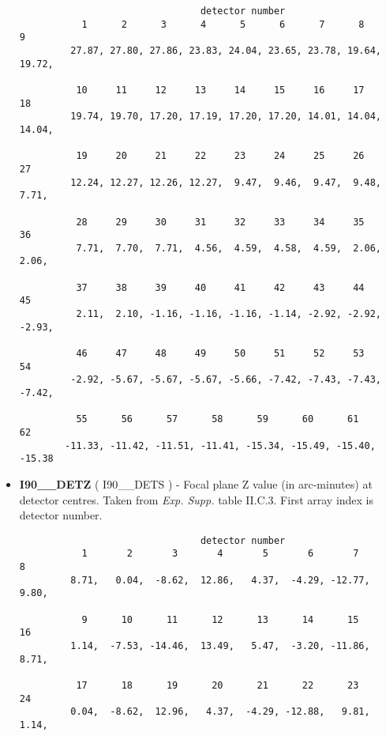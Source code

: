 \begin{itemize}
\begin{minipage}[t]{\textwidth}
\small
\begin{verbatim}
                                detector number
           1      2      3      4      5      6      7      8      9
         27.87, 27.80, 27.86, 23.83, 24.04, 23.65, 23.78, 19.64, 19.72, 

          10     11     12     13     14     15     16     17     18
         19.74, 19.70, 17.20, 17.19, 17.20, 17.20, 14.01, 14.04, 14.04, 

          19     20     21     22     23     24     25     26     27
         12.24, 12.27, 12.26, 12.27,  9.47,  9.46,  9.47,  9.48,  7.71,  

          28     29     30     31     32     33     34     35     36
          7.71,  7.70,  7.71,  4.56,  4.59,  4.58,  4.59,  2.06,  2.06,  

          37     38     39     40     41     42     43     44     45
          2.11,  2.10, -1.16, -1.16, -1.16, -1.14, -2.92, -2.92, -2.93, 

          46     47     48     49     50     51     52     53     54
         -2.92, -5.67, -5.67, -5.67, -5.66, -7.42, -7.43, -7.43, -7.42,

          55      56      57      58      59      60      61      62
        -11.33, -11.42, -11.51, -11.41, -15.34, -15.49, -15.40, -15.38

\end{verbatim}
\normalsize
\end{minipage}

\item {\bf I90\_\_DETZ} ( I90\_\_DETS ) -    Focal plane Z value (in arc-minutes) at
detector centres. Taken from {\em Exp.  Supp.} table II.C.3. First array index is detector number.

\begin{minipage}[t]{\textwidth}
\small
\begin{verbatim}
                                detector number
           1       2       3       4       5       6       7       8      
         8.71,   0.04,  -8.62,  12.86,   4.37,  -4.29, -12.77,   9.80,

           9      10      11      12      13      14      15      16      
         1.14,  -7.53, -14.46,  13.49,   5.47,  -3.20, -11.86,   8.71,

          17      18      19      20      21      22      23      24
         0.04,  -8.62,  12.96,   4.37,  -4.29, -12.88,   9.81,   1.14,


\end{verbatim}
\end{minipage}
\end{itemize}
